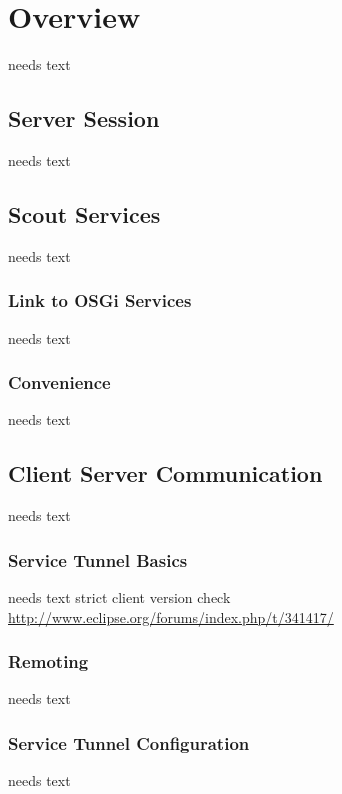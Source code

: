 \documentclass[a4paper,10pt,twoside]{book}
\begin{document}
  \sloppy
\fi


\chapter{Overview}
needs text
  
\section{Server Session}
needs text

\section{Scout Services}
needs text

\subsection{Link to OSGi Services}
needs text

\subsection{Convenience}
needs text
  
\section{Client Server Communication}
needs text

\subsection{Service Tunnel Basics}
needs text
strict client version check \url{http://www.eclipse.org/forums/index.php/t/341417/}

\subsection{Remoting}
needs text
  
\subsection{Service Tunnel Configuration}
needs text
  
\end{document}
